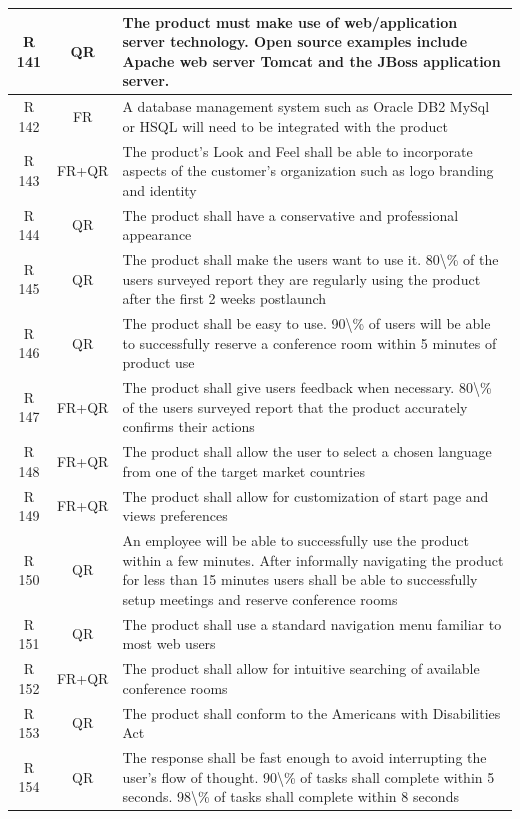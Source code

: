 \documentclass[dissertation,final]{softeng}
\begin{document}
\begin{appendices}
{\begin{center}
\begin{longtable}{c c m{}}
    R 141   & QR & The product must make use of web/application server technology. Open source examples include Apache web server Tomcat and the JBoss application server. \\    \midrule
    R 142   & FR & A database management system such as Oracle DB2 MySql or HSQL will need to be integrated with the product \\    \midrule
    R 143   & FR+QR & The product's Look and Feel shall be able to incorporate aspects of the customer's organization such as logo branding and identity \\    \midrule
    R 144   & QR & The product shall have a conservative and professional appearance \\    \midrule
    R 145   & QR & The product shall make the users want to use it. 80\textbackslash{}\% of the users surveyed report they are regularly using the product after the first 2 weeks postlaunch \\    \midrule
    R 146   & QR & The product shall be easy to use. 90\textbackslash{}\% of users will be able to successfully reserve a conference room within 5 minutes of product use \\*    \midrule
    R 147   & FR+QR & The product shall give users feedback when necessary. 80\textbackslash{}\% of the users surveyed report that the product accurately confirms their actions \\    \midrule
    R 148   & FR+QR & The product shall allow the user to select a chosen language from one of the target market countries \\ \midrule
    R 149   & FR+QR & The product shall allow for customization of start page and views preferences \\    \midrule
    R 150   & QR & An employee will be able to successfully use the product within a few minutes. After informally navigating the product for less than 15 minutes users shall be able to successfully setup meetings and reserve conference rooms \\    \midrule
    R 151   & QR & The product shall use a standard navigation menu familiar to most web users \\    \midrule
    R 152   & FR+QR & The product shall allow for intuitive searching of available conference rooms \\    \midrule
    R 153   & QR & The product shall conform to the Americans with Disabilities Act \\    \midrule
    R 154   & QR & The response shall be fast enough to avoid interrupting the user's flow of thought. 90\textbackslash{}\% of tasks shall complete within 5 seconds. 98\textbackslash{}\% of tasks shall complete within 8 seconds \\    \midrule

\end{longtable}
\end{center}}
\end{appendices}
\end{document}
